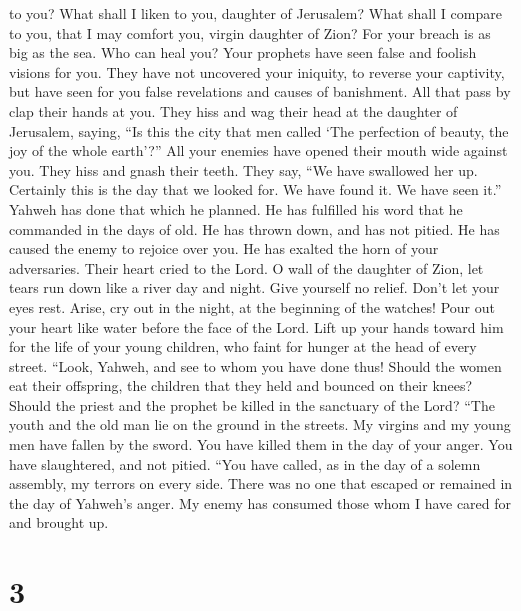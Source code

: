 to you? What shall I liken to you, daughter of Jerusalem? What shall I
compare to you, that I may comfort you, virgin daughter of Zion? For
your breach is as big as the sea. Who can heal you?  Your
prophets have seen false and foolish visions for you. They have not
uncovered your iniquity, to reverse your captivity, but have seen for
you false revelations and causes of banishment.  All that
pass by clap their hands at you. They hiss and wag their head at the
daughter of Jerusalem, saying, ``Is this the city that men called `The
perfection of beauty, the joy of the whole earth'?''  All
your enemies have opened their mouth wide against you. They hiss and
gnash their teeth. They say, ``We have swallowed her up. Certainly this
is the day that we looked for. We have found it. We have seen it.''
 Yahweh has done that which he planned. He has fulfilled
his word that he commanded in the days of old. He has thrown down, and
has not pitied. He has caused the enemy to rejoice over you. He has
exalted the horn of your adversaries.  Their heart cried to
the Lord. O wall of the daughter of Zion, let tears run down like a
river day and night. Give yourself no relief. Don't let your eyes rest.
 Arise, cry out in the night, at the beginning of the
watches! Pour out your heart like water before the face of the Lord.
Lift up your hands toward him for the life of your young children, who
faint for hunger at the head of every street.  ``Look,
Yahweh, and see to whom you have done thus! Should the women eat their
offspring, the children that they held and bounced on their knees?
Should the priest and the prophet be killed in the sanctuary of the
Lord?  ``The youth and the old man lie on the ground in the
streets. My virgins and my young men have fallen by the sword. You have
killed them in the day of your anger. You have slaughtered, and not
pitied.  ``You have called, as in the day of a solemn
assembly, my terrors on every side. There was no one that escaped or
remained in the day of Yahweh's anger. My enemy has consumed those whom
I have cared for and brought up.

\hypertarget{section-2}{%
\section{3}\label{section-2}}

